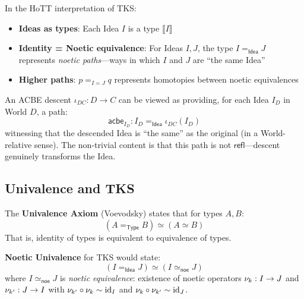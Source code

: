 \begin{definition}
\label{def:noetic-paths}
In the HoTT interpretation of TKS:
\begin{itemize}
  \item \textbf{Ideas as types}: Each Idea $I$ is a type $\llbracket I \rrbracket$
  \item \textbf{Identity = Noetic equivalence}: For Ideas $I, J$, the type
        $I =_{\mathsf{Idea}} J$ represents \emph{noetic paths}---ways in which
        $I$ and $J$ are ``the same Idea''
  \item \textbf{Higher paths}: $p =_{I = J} q$ represents homotopies between
        noetic equivalences
\end{itemize}
\end{definition}

\begin{example}
\label{ex:acbe-path}
An ACBE descent $\iota_{DC} : D \to C$ can be viewed as providing, for each
Idea $I_D$ in World $D$, a path:
\[
  \mathsf{acbe}_{I_D} : I_D =_{\mathsf{Idea}} \iota_{DC}(I_D)
\]
witnessing that the descended Idea is ``the same'' as the original (in a
World-relative sense). The non-trivial content is that this path is not
$\mathsf{refl}$---descent genuinely transforms the Idea.
\end{example}

\subsection{Univalence and TKS}
\label{subsec:univalence-tks}

\begin{definition}
\label{def:univalence}
The \textbf{Univalence Axiom} (Voevodsky) states that for types $A, B$:
\[
  (A =_{\mathsf{Type}} B) \simeq (A \simeq B)
\]
That is, identity of types is equivalent to equivalence of types.
\end{definition}

\begin{definition}
\label{def:noetic-univalence}
\textbf{Noetic Univalence} for TKS would state:
\[
  (I =_{\mathsf{Idea}} J) \simeq (I \simeq_{\mathsf{noe}} J)
\]
where $I \simeq_{\mathsf{noe}} J$ is \emph{noetic equivalence}: existence of
noetic operators $\nu_{k} : I \to J$ and $\nu_{k'} : J \to I$ with
$\nu_{k'} \circ \nu_{k} \sim \mathrm{id}_I$ and $\nu_{k} \circ \nu_{k'} \sim \mathrm{id}_J$.
\end{definition}

